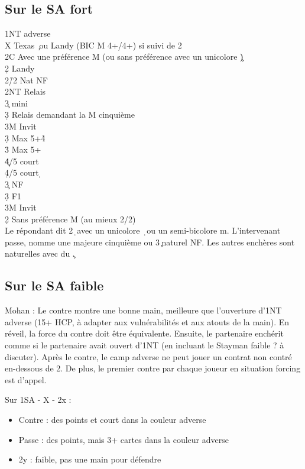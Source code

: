 \documentclass[a4paper]{article}
\begin{document}
\subsection{Sur le SA fort}

\begin{bidtable}
1NT \> adverse\+\\
X \> Texas \c\ ou Landy (BIC M 4+/4+) si suivi de 2\d \\
\>2C Avec une préférence M (ou sans préférence avec un unicolore \c )\+\\
2\d \> Landy\+\\
2\h/2\s \> Nat NF\\
2NT \> Relais\+\\
3\c \> mini\+\\
3\d \> Relais demandant la M cinquième\\
3M \> Invit\-\\
3\d \> Max 5+\h 4\s \\
3\h \> Max 5+\h \\
4\c {}/5 court \c \\
4\d {}/5 court \d \-\\
3\c \> NF\\
3\d \> F1\\
3M \> Invit\-\\
2\d \> Sans préférence M (au mieux 2/2)\+\\
Le \> répondant dit 2\d\ avec un unicolore \d\ ou un semi-bicolore m. L'intervenant passe, nomme une majeure cinquième ou 3\c\ naturel NF. Les autres enchères sont naturelles avec du \c .\-\-\-
\end{bidtable}

\subsection{Sur le SA faible}

Mohan : Le contre montre une bonne main, meilleure que l'ouverture d'1NT adverse (15+ HCP, à adapter aux vulnérabilités et aux atouts de la main). En réveil, la force du contre doit être équivalente.
Ensuite, le partenaire enchérit comme si le partenaire avait ouvert d'1NT (en incluant le Stayman faible ? à discuter).
Après le contre, le camp adverse ne peut jouer un contrat non contré en-dessous de 2\s . De plus, le premier contre par chaque joueur en situation forcing est d'appel.

Sur 1SA - X - 2x :

\begin{itemize}
\item Contre : des points et court dans la couleur adverse

\item Passe : des points, mais 3+ cartes dans la couleur adverse

\item 2y : faible, pas une main pour défendre

\end{itemize}
\end{document}
